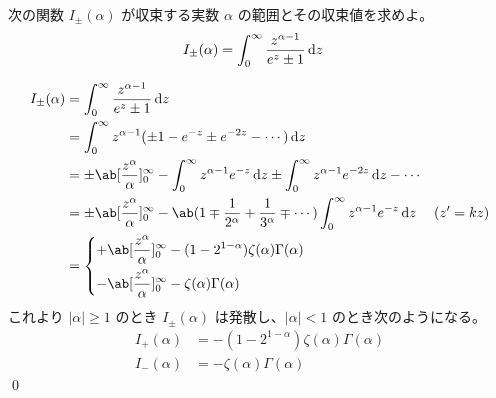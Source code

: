 \documentclass[uplatex,dvipdfmx,a4paper,11pt]{jlreq}
\makeatletter
\theoremstyle{definition}
\renewenvironment{proof}[1][\proofname]{\par
  \normalfont
  \topsep6\p@\@plus6\p@ \trivlist
  \item[\hskip\labelsep{\bfseries #1}\@addpunct{\bfseries}]\ignorespaces\quad\par
}{%
  \qed\endtrivlist\@endpefalse
}
\renewcommand\proofname{証明}
\makeatother
\begin{document}
\begin{problem}
次の関数 $I_\pm(\alpha)$ が収束する実数 $\alpha$ の範囲とその収束値を求めよ。
\begin{align}
  I_\pm(\alpha) & = \int_0^\infty\frac{z^{\alpha - 1}}{e^z \pm 1}\dl{z}
\end{align}
\end{problem}
\begin{proof}
  \begin{align}
    I_\pm(\alpha) & = \int_0^\infty\frac{z^{\alpha - 1}}{e^z \pm 1}\dl{z}                                                                                                          \\
                  & = \int_0^\infty z^{\alpha - 1}(\pm 1 - e^{-z} \pm e^{-2z} - \cdots)\dl{z}                                                                                      \\
                  & = \pm\ab[\frac{z^\alpha}{\alpha}]_0^\infty - \int_0^\infty z^{\alpha - 1}e^{-z}\dl{z} \pm \int_0^\infty z^{\alpha - 1}e^{-2z}\dl{z} - \cdots                   \\
                  & = \pm\ab[\frac{z^\alpha}{\alpha}]_0^\infty - \ab(1 \mp \frac{1}{2^\alpha} + \frac{1}{3^\alpha} \mp \cdots)\int_0^\infty z^{\alpha - 1}e^{-z}\dl{z} & (z' = kz) \\
                  & = \begin{dcases}
                        +\ab[\frac{z^\alpha}{\alpha}]_0^\infty - (1 - 2^{1 - \alpha})\zeta(\alpha)\Gamma(\alpha) \\
                        -\ab[\frac{z^\alpha}{\alpha}]_0^\infty - \zeta(\alpha)\Gamma(\alpha)                     \\
                      \end{dcases}
  \end{align}
  これより $|\alpha| \geq 1$ のとき $I_{\pm}(\alpha)$ は発散し、$|\alpha| < 1$ のとき次のようになる。
  \begin{align}
    I_+(\alpha) & = - (1 - 2^{1 - \alpha})\zeta(\alpha)\Gamma(\alpha) \\
    I_-(\alpha) & = - \zeta(\alpha)\Gamma(\alpha)
  \end{align}
\end{proof}

\setcounter{subsection}{5}
\end{document}

